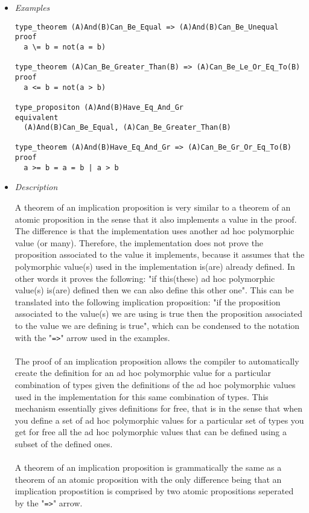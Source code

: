 \documentclass{article}
\begin{document}
\begin{itemize}
\item \textit{Examples}

\begin{verbatim}
type_theorem (A)And(B)Can_Be_Equal => (A)And(B)Can_Be_Unequal
proof
  a \= b = not(a = b)

type_theorem (A)Can_Be_Greater_Than(B) => (A)Can_Be_Le_Or_Eq_To(B)
proof
  a <= b = not(a > b)

type_propositon (A)And(B)Have_Eq_And_Gr
equivalent
  (A)And(B)Can_Be_Equal, (A)Can_Be_Greater_Than(B)

type_theorem (A)And(B)Have_Eq_And_Gr => (A)Can_Be_Gr_Or_Eq_To(B)
proof
  a >= b = a = b | a > b
\end{verbatim}

\item \textit{Description}

A theorem of an implication proposition is very similar to a theorem of an
atomic proposition in the sense that it also implements a value in the proof.
The difference is that the implementation uses another ad hoc polymorphic value
(or many). Therefore, the implementation does not prove the proposition
associated to the value it implements, because it assumes that the polymorphic
value(s) used in the implementation is(are) already defined. In other words it
proves the following: "if this(these) ad hoc polymorphic value(s) is(are)
defined then we can also define this other one". This can be translated into
the following implication proposition: "if the proposition associated to the
value(s) we are using is true then the proposition associated to the value we
are defining is true", which can be condensed to the notation with the
"\texttt{=>}" arrow used in the examples.
\\\\
The proof of an implication proposition allows the compiler to
automatically create the definition for an ad hoc polymorphic value for a
particular combination of types given the definitions of the ad hoc polymorphic
values used in the implementation for this same combination of types. This
mechanism essentially gives definitions for free, that is in the sense that
when you define a set of ad hoc polymorphic values for a particular set of
types you get for free all the ad hoc polymorphic values that can be defined
using a subset of the defined ones. 
\\\\
A theorem of an implication proposition is grammatically the same as
a theorem of an atomic proposition with the only difference being that an 
implication propostition is comprised by two atomic propositions seperated by
the "\texttt{=>}" arrow.

\end{itemize}
\end{document}
